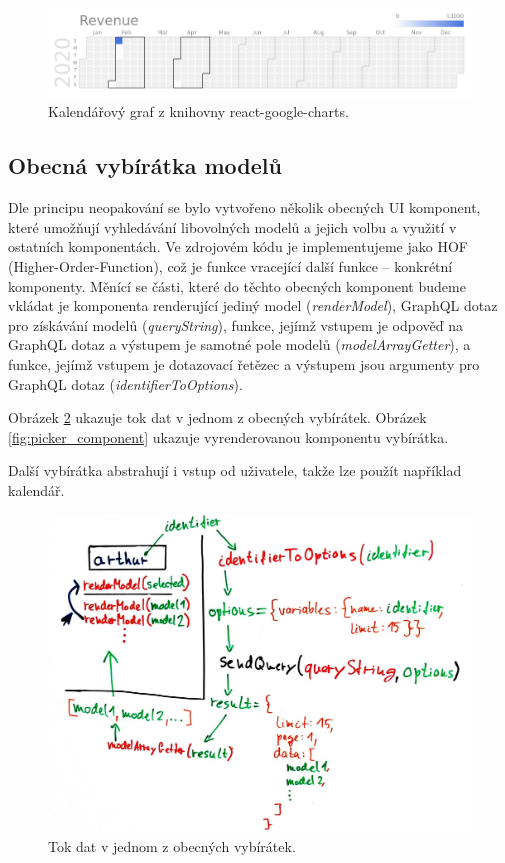 \begin{figure}[!htb] \centering
  \includegraphics[width=145mm]{../img/google_charts.png}
  \caption{Kalendářový graf z knihovny react-google-charts.}
  \label{fig:google_charts}
\end{figure}


\subsection{Obecná vybírátka modelů}

Dle principu neopakování se bylo vytvořeno několik obecných UI komponent, které umožňují vyhledávání libovolných
modelů a jejich volbu a využití v ostatních komponentách. Ve zdrojovém kódu je implementujeme jako
HOF (Higher-Order-Function), což je funkce vracející další funkce -- konkrétní komponenty.
Měnící se části, které do těchto obecných komponent budeme vkládat je komponenta renderující jediný model
(\textit{renderModel}),
GraphQL dotaz pro získávání modelů (\textit{queryString}), funkce, jejímž vstupem je odpověď na GraphQL dotaz a výstupem je
samotné pole modelů (\textit{modelArrayGetter}), a funkce, jejímž vstupem je dotazovací řetězec a výstupem jsou
argumenty pro GraphQL dotaz (\textit{identifierToOptions}).

Obrázek \ref{fig:picker_lifecycle} ukazuje tok dat v jednom z obecných vybírátek.
Obrázek \ref{fig:picker_component} ukazuje vyrenderovanou komponentu vybírátka.

Další vybírátka abstrahují i vstup od uživatele, takže lze použít například kalendář.

\begin{figure}[!htb] \centering
  \includegraphics[width=145mm]{../img/picker_lifecycle.jpg}
  \caption{Tok dat v jednom z obecných vybírátek.}
  \label{fig:picker_lifecycle}
\end{figure}

